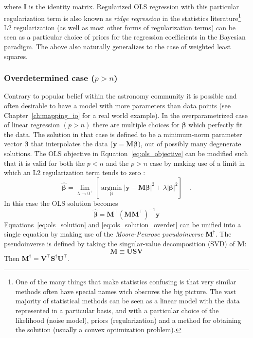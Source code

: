 \documentclass[12pt,dvipsnames]{report}
\renewcommand{\vec}[1]{\boldsymbol{\mathbf{#1}}}
\begin{document}
where $\vec{I}$ is the identity matrix. Regularized OLS regression with this particular
regularization term is also known as \emph{ridge regression} in the statistics
literature\footnote{One of the many things that make statistics confusing is that very
    similar methods often have special names wich obscures the big picture. The vast majority
    of statistical methods can be seen as a linear model with the data represented in a particular
    basis, and with a particular choice of the likelihood (noise model), priors (regularization)
    and  a method for obtaining the solution (usually a convex optimization problem).}
L2 regularization (as well as most other forms of regularization terms) can be seen
as a particular choice of priors for the regression coefficients in the Bayesian paradigm.
The above also naturally generalizes to the case of weighted least squares.

\subsubsection{Overdetermined case ($p > n$)}
Contrary to popular belief within the astronomy community it is possible and
often desirable to have a model with more parameters than data points (see
Chapter~\ref{ch:mapping_io} for a real world example). In the overparametrized
case of linear regression $(p > n)$ there are multiple choices for $\vec\beta$
which perfectly fit the data. The solution in that case is defined to be a
minimum-norm parameter vector $\vec\beta$ that interpolates the data
($\vec{y}=\vec{M} \vec\beta$), out of possibly many degenerate solutions. The OLS
objective in Equation~\ref{eq:ols_objective} can be modified such that it is
valid for both the $p<n$ and the $p>n$ case by making use of a limit in which
an L2 regularization term tends to zero \citep{arXiv:2101.07256}:
\begin{equation}
    \hat{\vec\beta}=\lim _{\lambda \rightarrow 0^{+}}\left[
    \underset{\vec\beta}{\operatorname{argmin}}\left|\vec{y}-\vec{M} \vec\beta\right|^{2} + \lambda \left|\vec\beta\right|^2\right]\quad .
\end{equation}
In this case the OLS solution becomes
\begin{equation}
    \hat{\vec\beta}=\vec{M}^{\intercal} (\vec{M} \vec{M}^{\intercal})^{-1} \vec{y}
    \label{eq:ols_solution_overdet}
\end{equation}
Equations~\ref{eq:ols_solution} and \ref{eq:ols_solution_overdet} can be unified into a
single equation by making use of the \emph{Moore-Penrose pseudoinverse} $\vec{M}^\dagger$.
The pseudoinverse is defined by taking the singular-value decomposition (SVD)
of $\vec{M}$:
\begin{equation}
    \vec{M}\equiv\vec{U} \vec{S} \vec{V}
\end{equation}
Then $\vec{M}^\dagger =  \vec{V}^{\intercal} \vec{S}^{\dagger} \vec{U}^{\intercal}$.
\end{document}
